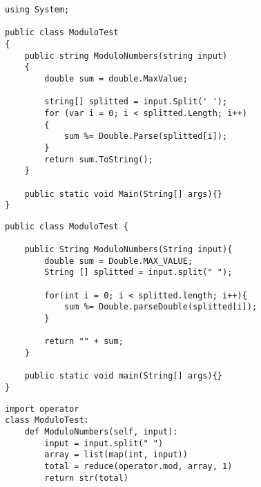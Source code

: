 	\lstset{style=sharpc}
	\begin{lstlisting}
using System;

public class ModuloTest
{
    public string ModuloNumbers(string input)
    {
        double sum = double.MaxValue;

        string[] splitted = input.Split(' ');
        for (var i = 0; i < splitted.Length; i++)
        {
            sum %= Double.Parse(splitted[i]);
        }
        return sum.ToString();
    }

	public static void Main(String[] args){}
}
	\end{lstlisting}

	\lstset{style=java}
	\begin{lstlisting}
public class ModuloTest {

	public String ModuloNumbers(String input){
		double sum = Double.MAX_VALUE;
		String [] splitted = input.split(" ");

		for(int i = 0; i < splitted.length; i++){
			sum %= Double.parseDouble(splitted[i]);
		}

		return "" + sum;
	}

	public static void main(String[] args){}
}

	\end{lstlisting}


	\lstset{style=python}
	\begin{lstlisting}
import operator
class ModuloTest:
    def ModuloNumbers(self, input):
        input = input.split(" ")
        array = list(map(int, input))
        total = reduce(operator.mod, array, 1)
        return str(total)
	\end{lstlisting}




